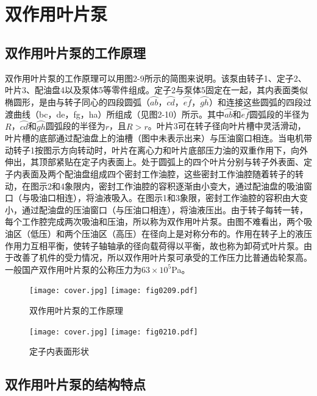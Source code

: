 \section{双作用叶片泵}

\subsection{双作用叶片泵的工作原理}

双作用叶片泵的工作原理可以用图2-9所示的简图来说明。该泵由转子1、定子2、叶片3、配油盘4以及泵体5等零件组成。定子2与泵体5固定在一起，其内表面类似椭圆形，是由与转子同心的四段圆弧（$\wideparen{ab}$，$\wideparen{cd}$，$\wideparen{ef}$，$\wideparen{gh}$）和连接这些圆弧的四段过渡曲线（bc，de，fg，ha）所组成（见图2-10）所示。其中$\wideparen{ab}$和$\wideparen{ef}$圆弧段的半径为$R$，$\wideparen{cd}$和$\wideparen{gh}$圆弧段的半径为$r$，且$R>r$。叶片3可在转子径向叶片槽中灵活滑动，叶片槽的底部通过配油盘上的油槽（图中未表示出来）与压油窗口相连。当电机带动转子1按图示方向转动时，叶片在离心力和叶片底部压力油的双重作用下，向外伸出，其顶部紧贴在定子内表面上。处于圆弧上的四个叶片分别与转子外表面、定子内表面及两个配油盘组成四个密封工作油腔，这些密封工作油腔随着转子的转动，在图示2和4象限内，密封工作油腔的容积逐渐由小变大，通过配油盘的吸油窗口（与吸油口相连），将油液吸入。在图示1和3象限，密封工作油腔的容积由大变小，通过配油盘的压油窗口（与压油口相连），将油液压出。由于转子每转一转，每个工作腔完成两次吸油和压油，所以称为双作用叶片泵。由图不难看出，两个吸油区（低压）和两个压油区（高压）在径向上是对称分布的。作用在转子上的液压作用力互相平衡，使转子轴轴承的径向载荷得以平衡，故也称为卸荷式叶片泵。由于改善了机件的受力情况，所以双作用叶片泵可承受的工作压力比普通齿轮泵高。一般国产双作用叶片泵的公称压力为$63\times10^5$Pa。

\begin{figure}[htbp]
\centering
\ifOpenSource
\texttt{[image: cover.jpg]}
\else
\texttt{[image: fig0209.pdf]}
\fi
\caption{双作用叶片泵的工作原理}
\label{fig:fig0209}
\end{figure}

\begin{figure}[htbp]
\centering
\ifOpenSource
\texttt{[image: cover.jpg]}
\else
\texttt{[image: fig0210.pdf]}
\fi
\caption{定子内表面形状}
\label{fig:fig0210}
\end{figure}


\subsection{双作用叶片泵的结构特点}


